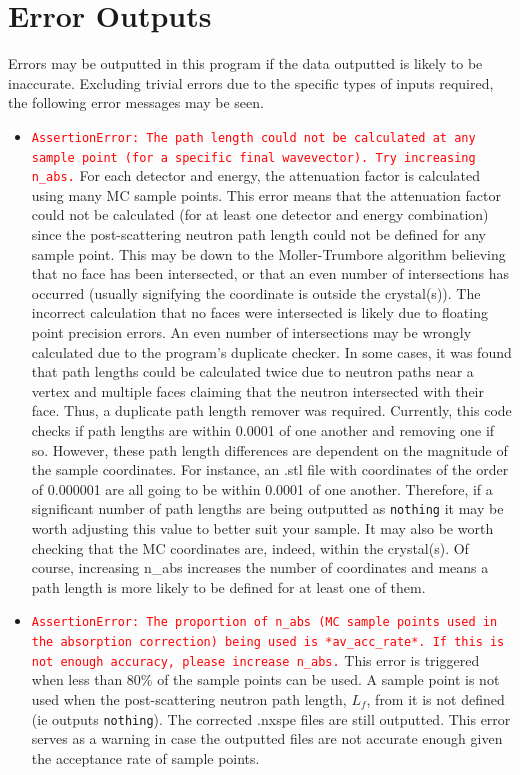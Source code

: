 \documentclass{article}
\begin{document}
\section{Error Outputs}
Errors may be outputted in this program if the data outputted is likely to be inaccurate. Excluding trivial errors due to the specific types of inputs required, the following error messages may be seen.
\begin{itemize}
    \item \texttt{\textcolor{red}{AssertionError: The path length could not be calculated at any sample point (for a specific final wavevector). Try increasing n\_abs.}} For each detector and energy, the attenuation factor is calculated using many MC sample points. This error means that the attenuation factor could not be calculated (for at least one detector and energy combination) since the post-scattering neutron path length could not be defined for any sample point. This may be down to the Moller-Trumbore algorithm believing that no face has been intersected, or that an even number of intersections has occurred (usually signifying the coordinate is outside the crystal(s)). The incorrect calculation that no faces were intersected is likely due to floating point precision errors. An even number of intersections may be wrongly calculated due to the program's duplicate checker. In some cases, it was found that path lengths could be calculated twice due to neutron paths near a vertex and multiple faces claiming that the neutron intersected with their face. Thus, a duplicate path length remover was required. Currently, this code checks if path lengths are within 0.0001 of one another and removing one if so. However, these path length differences are dependent on the magnitude of the sample coordinates. For instance, an .stl file with coordinates of the order of 0.000001 are all going to be within 0.0001 of one another. Therefore, if a significant number of path lengths are being outputted as \verb!nothing! it may be worth adjusting this value to better suit your sample. It may also be worth checking that the MC coordinates are, indeed, within the crystal(s). Of course, increasing n\_abs increases the number of coordinates and means a path length is more likely to be defined for at least one of them.
    \item \texttt{\textcolor{red}{AssertionError: The proportion of n\_abs (MC sample points used in the absorption correction) being used is *av\_acc\_rate*. If this is not enough accuracy, please increase n\_abs.}} This error is triggered when less than 80\% of the sample points can be used. A sample point is not used when the post-scattering neutron path length, $L_f$, from it is not defined (ie outputs \verb!nothing!). The corrected .nxspe files are still outputted. This error serves as a warning in case the outputted files are not accurate enough given the acceptance rate of sample points.
\end{itemize}
\end{document}

